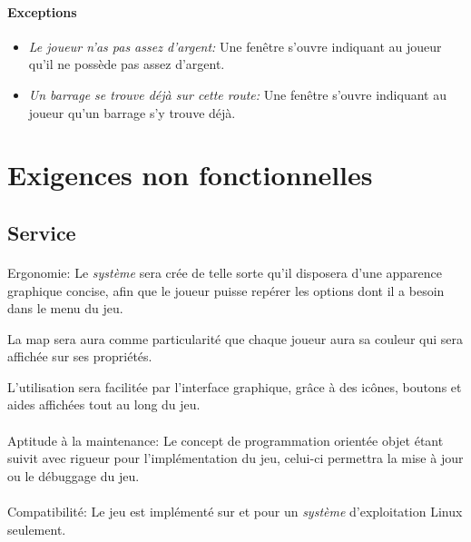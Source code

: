 \documentclass[a4paper,11pt]{report}
\begin{document}
\paragraph{Exceptions}
\begin{itemize}
	\item \textit{Le joueur n'as pas assez d'argent:}  Une fenêtre s'ouvre indiquant au joueur qu'il ne possède pas assez d'argent.
	\item \textit{Un barrage se trouve déjà sur cette route:}  Une fenêtre s'ouvre indiquant au joueur qu'un barrage s'y trouve déjà.
\end{itemize}




\newpage
\section{Exigences non fonctionnelles}
\subsection{Service}
\paragraph{}Ergonomie:  \newline
Le \textit{système} sera crée de telle sorte qu'il disposera d’une apparence graphique concise, afin que le joueur puisse repérer les options dont il a besoin dans le menu du jeu.

La map sera aura comme particularité que chaque joueur aura sa couleur qui sera affichée sur ses propriétés.

L'utilisation sera facilitée par l'interface graphique, grâce à des icônes, boutons et aides affichées tout au long du jeu.

\paragraph{}Aptitude à la maintenance:  \newline
Le concept de programmation orientée objet étant suivit avec rigueur pour l’implémentation du jeu, celui-ci permettra la mise à jour ou le débuggage du jeu.

\paragraph{}Compatibilité:  \newline
Le jeu est implémenté sur et pour un \textit{système} d'exploitation Linux seulement.
\end{document}

